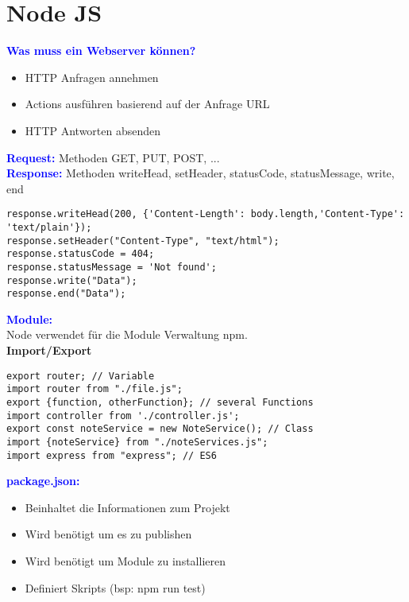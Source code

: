 \section{Node JS}
\textbf{\textcolor{blue}{Was muss ein Webserver können?}}
\begin{itemize}[topsep=0pt, leftmargin=3mm]
    \setlength\itemsep{-0.3em}
    \item HTTP Anfragen annehmen
    \item Actions ausführen basierend auf der Anfrage URL
    \item HTTP Antworten absenden
\end{itemize}
\textbf{\textcolor{blue}{Request:}} Methoden GET, PUT, POST, ...\\
\textbf{\textcolor{blue}{Response:}} Methoden writeHead, setHeader, statusCode, statusMessage, write, end
\begin{lstlisting}[style=htmlcssjs]
response.writeHead(200, {'Content-Length': body.length,'Content-Type': 'text/plain'});
response.setHeader("Content-Type", "text/html");
response.statusCode = 404;
response.statusMessage = 'Not found';
response.write("Data");
response.end("Data");
\end{lstlisting}
\textbf{\textcolor{blue}{Module:}}\\
Node verwendet für die Module Verwaltung npm.\\
\textbf{Import/Export}
\begin{lstlisting}[style=htmlcssjs]
export router; // Variable
import router from "./file.js";
export {function, otherFunction}; // several Functions
import controller from './controller.js';
export const noteService = new NoteService(); // Class
import {noteService} from "./noteServices.js";
import express from "express"; // ES6
\end{lstlisting}
\textbf{\textcolor{blue}{package.json:}}
\begin{itemize}[topsep=0pt, leftmargin=3mm]
    \setlength\itemsep{-0.3em}
    \item Beinhaltet die Informationen zum Projekt
    \item Wird benötigt um es zu publishen
    \item Wird benötigt um Module zu installieren
    \item Definiert Skripts (bsp: npm run test)
\end{itemize}
